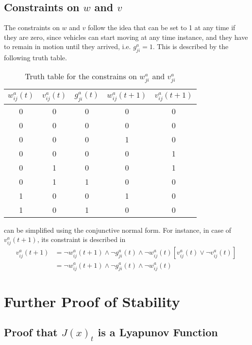 \subsection{Constraints on $w$ and $v$}\label{appendix:sec:const_w_v}
The constraints on $w$ and $v$ follow the idea that can be set to 1 at any time if they are zero, since vehicles can start moving at any time instance, and they have to remain in motion until they arrived, i.e. $g^a_{ji}=1$. This is described by the following truth table. 
\begin{table}
	\centering
	\begin{tabular}{ |c|c|c|c|c|}
		\hline
		$w^a_{ij}(t)$ &$v^a_{ij}(t)$&$g^a_{ji}(t)$ &$w^a_{ij}(t+1)$&$v^a_{ij}(t+1)$ \\
		\hline
		0&0&0&0 &0\\
		0&0&0& 0&0\\
		0&0&0& 1&0\\
		0&0&0& 0&1\\
		0&1&0& 0&1\\
		0&1&1& 0&0\\
		1&0&0&1 &0\\
		1&0&1& 0&0\\
	\end{tabular}
	\caption{Truth table for the constrains on $w^a_{ji}$ and $v^a_{ji}$}
	\label{appendix:tab:propagation_of_w_v}
\end{table}
 can be simplified using the conjunctive normal form. For instance, in case of $v^a_{ij}(t+1)$, its constraint is described in 
\begin{equation}
	\begin{aligned}
		v^a_{ij}(t+1) &= \lnot w^a_{ij}(t+1) \land \lnot g^a_{ji}(t) \land \lnot w^a_{ij}(t) [v^a_{ij}(t)  \lor \lnot v^a_{ij}(t) ] \\
							&=\lnot w^a_{ij}(t+1) \land \lnot g^a_{ji}(t) \land \lnot w^a_{ij}(t)
	\end{aligned}
	\label{appendix:eq:v}
\end{equation}


\section{Further Proof of Stability}
\subsection{Proof that $J(x)_t $ is a Lyapunov Function}\label{appendix:sec:lyapunovitity_time}

